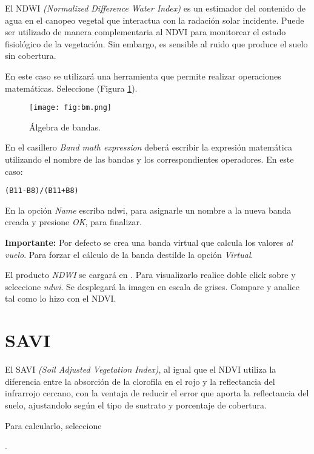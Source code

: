 El NDWI \emph{(Normalized Difference Water Index)} es un estimador del contenido de agua en el canopeo vegetal que interactua con la radación solar incidente. Puede ser utilizado de manera complementaria al NDVI para monitorear el estado fisiológico de la vegetación. Sin embargo, es sensible al ruido que produce el suelo sin cobertura.


En este caso se utilizará una herramienta que permite realizar operaciones matemáticas. Seleccione  (Figura \ref{fig:bm2}).

 \begin{figure}[h!]
     \centering
     \texttt{[image: fig:bm.png]}
     \caption{Álgebra de bandas.}
     \label{fig:bm2}
 \end{figure}


En el casillero \emph{Band math expression} deberá escribir la expresión matemática utilizando el nombre de las bandas y los correspondientes operadores. En este caso:

\begin{center}
\texttt{(B11-B8)/(B11+B8)}
\end{center}

En la opción \emph{Name} escriba ndwi, para asignarle un nombre a la nueva banda creada y presione \emph{OK}, para finalizar.

 {\bf Importante:} Por defecto se crea una banda virtual que calcula los valores \emph{al vuelo}. Para forzar el cálculo de la banda destilde la opción \emph{Virtual}.

El producto \emph{NDWI} se cargará en . Para visualizarlo realice doble click sobre  y seleccione \emph{ndwi}. Se desplegará la imagen en escala de grises. Compare y analice tal como lo hizo con el NDVI.

\section{SAVI}

El SAVI \emph{(Soil Adjusted Vegetation Index)}, al igual que el NDVI utiliza la diferencia entre la absorción de la clorofila en el rojo y la reflectancia del infrarrojo cercano, con la ventaja de reducir el error que aporta la reflectancia del suelo, ajustandolo según el tipo de sustrato y porcentaje de cobertura.

Para calcularlo, seleccione

\begin{center}
.
\end{center}

